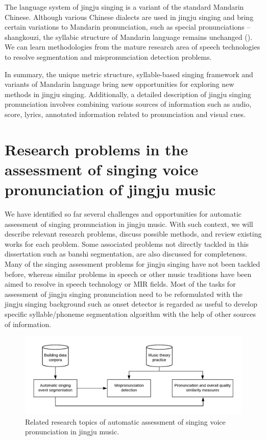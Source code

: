 The language system of jingju singing is a variant of the standard Mandarin Chinese. Although various Chinese dialects are used in jingju singing and bring certain variations to Mandarin pronunciation, such as special pronunciations -- shangkouzi, the syllabic structure of Mandarin language remains unchanged (). We can learn methodologies from the mature research area of speech technologies to resolve segmentation and mispronunciation detection problems. 

In summary, the unique metric structure, syllable-based singing framework and variants of Mandarin language bring new opportunities for exploring new methods in jingju singing. Additionally, a detailed description of jingju singing pronunciation involves combining various sources of information such as audio, score, lyrics, annotated information related to pronunciation and visual cues.

\section{Research problems in the assessment of singing voice pronunciation of jingju music}

We have identified so far several challenges and opportunities for automatic assessment of singing pronunciation in jingju music. With such context, we will describe relevant research problems, discuss possible methods, and review existing works for each problem. Some associated problems not directly tackled in this dissertation such as banshi segmentation, are also discussed for completeness. Many of the singing assessment problems for jingju singing have not been tackled before, whereas similar problems in speech or other music traditions have been aimed to resolve in speech technology or MIR fields. Most of the tasks for assessment of jingju singing pronunciation need to be reformulated with the jingju singing background such as onset detector is regarded as useful to develop specific syllable/phoneme segmentation algorithm with the help of other sources of information.

\begin{figure}[ht!]
\includegraphics[width=\textwidth]{figs/blockDiags_rong/ch3_related_topics.png}
\caption{Related research topics of automatic assessment of singing voice pronunciation in jingju music.}
\label{fig:related_research_topics}
\end{figure}

